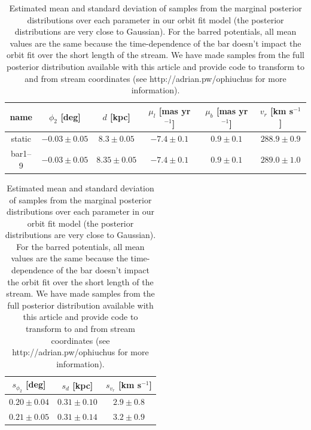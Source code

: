 \begin{table}[ht]
\footnotesize
\begin{center}
	\begin{tabular}{cccccc}
	\toprule
	name & $\phi_2$ [deg] & $d$ [kpc] & $\mu_l$ [mas yr$^{-1}$] & $\mu_b$ [mas yr$^{-1}$] & $v_r$ [km s$^{-1}$]\\\midrule
	static & $-0.03\pm0.05$ & $8.3\pm0.05$ & $-7.4\pm0.1$ & $0.9\pm0.1$ & $288.9\pm0.9$\\
	bar1--9 & $-0.03\pm0.05$ & $8.35\pm0.05$ & $-7.4\pm0.1$ & $0.9\pm0.1$ & $289.0\pm1.0$\\
	\bottomrule
	\end{tabular}
	
	\begin{tabular}{ccc}
	\toprule
	$s_{\phi_2}$ [deg] & $s_{d}$ [kpc] & $s_{v_r}$ [km s$^{-1}$]\\\midrule
	$0.20\pm0.04$ & $0.31\pm0.10$ & $2.9\pm0.8$\\
	$0.21\pm0.05$ & $0.31\pm0.14$ & $3.2\pm0.9$\\
	\bottomrule
	\end{tabular}
	\caption{Estimated mean and standard deviation of samples from the marginal posterior distributions over each parameter in our orbit fit model (the posterior distributions are very close to Gaussian). For the barred potentials, all mean values are the same because the time-dependence of the bar doesn't impact the orbit fit over the short length of the stream. We have made samples from the full posterior distribution available with this article and provide code to transform to and from stream coordinates (see http://adrian.pw/ophiuchus for more information).\label{tbl:param-means} }
\end{center}
\end{table}


